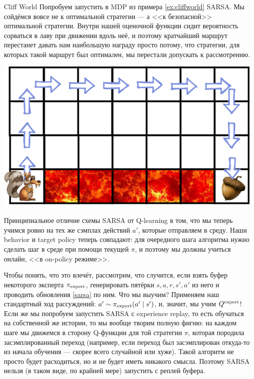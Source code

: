 \begin{exampleBox}[righthand ratio=0.35, sidebyside, sidebyside align=center, lower separated=false]{Cliff World}
Попробуем запустить в MDP из примера \ref{ex:cliffworld} SARSA. Мы сойдёмся вовсе не к оптимальной стратегии --- а <<к безопасной>> оптимальной стратегии. Внутри нашей оценочной функции сидит вероятность сорваться в лаву при движении вдоль неё, и поэтому кратчайший маршрут перестанет давать нам наибольшую награду просто потому, что стратегии, для которых такой маршрут был оптимален, мы перестали допускать к рассмотрению.

\tcblower
\includegraphics[width=\textwidth]{Images/SafeRL2.png}
\end{exampleBox}

Принципиальное отличие схемы SARSA от Q-learning в том, что мы теперь учимся ровно на тех же сэмплах действий $a'$, которые отправляем в среду. Наши behavior и target policy теперь совпадают: для очередного шага алгоритма нужно сделать шаг в среде при помощи текущей $\pi$, и поэтому мы должны учиться онлайн, <<в on-policy режиме>>.

Чтобы понять, что это влечёт, рассмотрим, что случится, если взять буфер некоторого эксперта $\pi_{\mathrm{expert}}$, генерировать пятёрки $s, a, r, s', a'$ из него и проводить обновления \eqref{sarsa} по ним. Что мы выучим? Применяем наш стандартный ход рассуждений: $a' \HM\sim \pi_{\expert}(a' \mid s')$, и, значит, мы учим $Q^{\mathrm{expert}}$! Если же мы попробуем запустить SARSA с experience replay, то есть обучаться на собственной же истории, то мы вообще творим полную фигню: на каждом шаге мы движемся в сторону Q-функции для той стратегии $\pi$, которая породила засэмплированный переход (например, если переход был засэмплирован откуда-то из начала обучения --- скорее всего случайной или хуже). Такой алгоритм не просто будет расходиться, но и не будет иметь никакого смысла. Поэтому SARSA нельзя (в таком виде, по крайней мере) запустить с реплей буфера.


